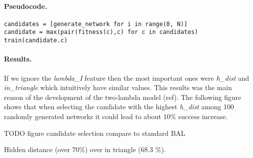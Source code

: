 \paragraph{Pseudocode.} 
\begin{lstlisting} 
candidates = [generate_network for i in range(0, N)] 
candidate = max(pair(fitness(c),c) for c in candidates) 
train(candidate.c) 
\end{lstlisting} 


\paragraph{Results.} 
If we ignore the \emph{lambda\_I} feature then the most important ones were \emph{h\_dist} and \emph{in\_triangle} which intuitively have similar values. This results was the main reason of the development of the two-lambda model (ref). The following figure shows that when selecting the candidate with the highest \emph{h\_dist} among 100 randomly generated networks it could lead to about 10\% success increase. 

TODO figure candidate selection compare to standard BAL 

Hidden distance (over 70\%) over in triangle (68.3 \%). 

